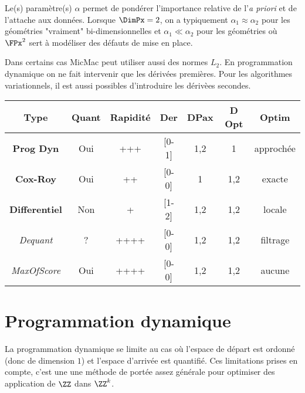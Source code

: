 Le(s) param\`etre(s) $\alpha$ permet de pond\'erer l'importance relative
de l'\emph{a priori} et de l'attache aux donn\'ees.
Lorsque  $\DimPx=2$, on a typiquement
$\alpha_1 \approx \alpha_2$ pour les g\'eom\'etries "vraiment"
bi-dimensionnelles et  $\alpha_1 \ll \alpha_2$ pour les
g\'eom\'etries o\`u $\FPx^2$ sert \`a mod\'eliser des d\'efauts de mise
en place.

Dans certains cas MicMac peut utiliser aussi des normes $L_2$.
En programmation dynamique on ne fait intervenir que les d\'eriv\'ees
premi\`eres. Pour les algorithmes variationnels, il est aussi
possibles d'introduire les d\'eriv\`ees secondes.

\begin{tabular} { c | c | c | c| c| c | c} %

 {\bf Type }        &  {Quant} & {Rapidit\'e} & {Der} &  {DPax} &  {D Opt} & {Optim}\\  \hline \hline
 {\bf Prog Dyn }    &  {Oui} & {+++} &          {[0-1]} & {1,2} & {1} &{approch\'ee}\\  \hline
 {\bf Cox-Roy }     &  {Oui} & {++} &           {[0-0]} & {1} & {1,2} & {exacte}\\  \hline
 {\bf Differentiel }&  {Non} & {+} &            {[1-2]} & {1,2} & {1,2} &{locale} \\  \hline  \hline
 {\it Dequant }     &  {?} & {++++} &           {[0-0]} & {1,2} & {1,2} &{filtrage}\\  \hline
 {\it MaxOfScore }  &  {Oui} & {++++} &         {[0-0]} & {1,2} & {1,2} &{aucune} \\  \hline

\end{tabular}




\section{Programmation dynamique}

La programmation dynamique se limite au cas o\`u l'espace de d\'epart est
ordonn\'e (donc de dimension $1$) et l'espace d'arriv\'ee est quantifi\'e.
Ces limitations prises en compte, c'est une
une m\'ethode de port\'ee assez g\'en\'erale
pour optimiser   des application de  $\ZZ$ dans $\ZZ^k$.


